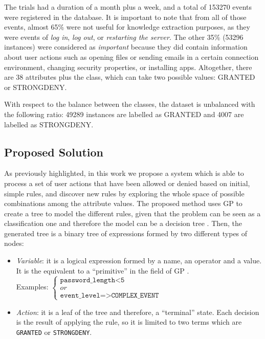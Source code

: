 \documentclass[a4paper,10pt,twocolumn,preprint,3p]{elsarticle}
\begin{document}
The trials had a duration of a month plus a week, and a total of
153270 events were registered in the database. It is important to note
that from all of those events, almost 65\% were not useful for
knowledge extraction purposes, as they were events of \textit{log in},
\textit{log out}, or \textit{restarting the server}. %
The other 35\% (53296 instances) were considered as \textit{important}
because they did contain information about user actions such as
opening files or sending emails in a certain connection environment,
changing security properties, or installing apps. Altogether, there
are 38 attributes plus the class, which can take two possible values:
GRANTED or STRONGDENY. 

With respect to the balance between the classes, the dataset is
unbalanced with the following ratio: 49289 instances are labelled as
GRANTED and 4007 are labelled as STRONGDENY. 

\subsection{Proposed Solution}
\label{subsec:solution}
As previously highlighted, in this work we propose a system which is
able to process a set of user actions that have been allowed or denied
based on initial, simple rules, and discover new rules by exploring
the whole space of possible combinations among the attribute
values. The proposed method uses GP to create a tree to model the
different rules, given that the problem can be seen as a
classification one and therefore the model can be a decision tree
\cite{safavian1990survey}. Then, the generated tree is a binary tree
of expressions formed by two different types of nodes:

\begin{itemize}
\item {\em Variable}: it is a logical expression formed by a name, an operator and a value. It is the equivalent to a ``primitive'' in the field of GP \cite{back1996evolutionary}.  \\
    Examples:
   \begin{math}
     \left \{
   \begin{array}{l}
     \texttt{password\_length<5} \\
     or \\
      \texttt{event\_level=>COMPLEX\_EVENT}
   \end{array}
   \right .
   \end{math}
\item {\em Action}: it is a leaf of the   tree and therefore, a ``terminal'' state. Each decision is the result of applying the rule, so it is limited to two terms which are \texttt{GRANTED} or \texttt{STRONGDENY}.
\end{itemize}
\end{document}
